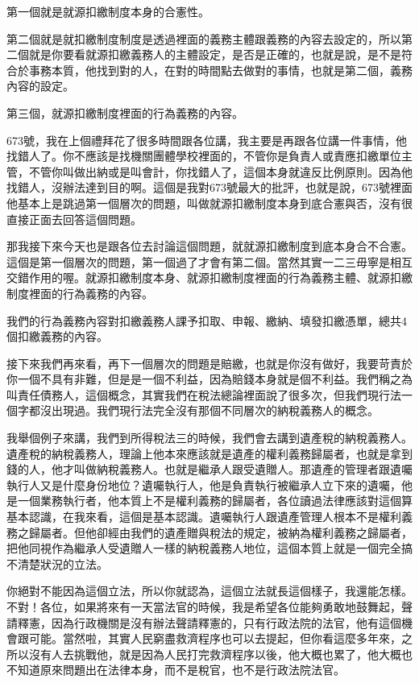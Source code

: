 \documentclass[]{ctexbook}
\begin{document}
第一個就是就源扣繳制度本身的合憲性。

第二個就是就扣繳制度制度是透過裡面的義務主體跟義務的內容去設定的，所以第二個就是你要看就源扣繳義務人的主體設定，是否是正確的，也就是說，是不是符合於事務本質，他找到對的人，在對的時間點去做對的事情，也就是第二個，義務內容的設定。

第三個，就源扣繳制度裡面的行為義務的內容。

673號，我在上個禮拜花了很多時間跟各位講，我主要是再跟各位講一件事情，他找錯人了。你不應該是找機關團體學校裡面的，不管你是負責人或責應扣繳單位主管，不管你叫做出納或是叫會計，你找錯人了，這個本身就違反比例原則。因為他找錯人，沒辦法達到目的啊。這個是我對673號最大的批評，也就是說，673號裡面他基本上是跳過第一個層次的問題，叫做就源扣繳制度本身到底合憲與否，沒有很直接正面去回答這個問題。

那我接下來今天也是跟各位去討論這個問題，就就源扣繳制度到底本身合不合憲。這個是第一個層次的問題，第一個過了才會有第二個。當然其實一二三毋寧是相互交錯作用的喔。就源扣繳制度本身、就源扣繳制度裡面的行為義務主體、就源扣繳制度裡面的行為義務的內容。

我們的行為義務內容對扣繳義務人課予扣取、申報、繳納、填發扣繳憑單，總共4個扣繳義務的內容。

接下來我們再來看，再下一個層次的問題是賠繳，也就是你沒有做好，我要苛責於你一個不具有非難，但是是一個不利益，因為賠錢本身就是個不利益。我們稱之為叫責任債務人，這個概念，其實我們在稅法總論裡面說了很多次，但我們現行法一個字都沒出現過。我們現行法完全沒有那個不同層次的納稅義務人的概念。

我舉個例子來講，我們到所得稅法三的時候，我們會去講到遺產稅的納稅義務人。遺產稅的納稅義務人，理論上他本來應該就是遺產的權利義務歸屬者，也就是拿到錢的人，他才叫做納稅義務人。也就是繼承人跟受遺贈人。那遺產的管理者跟遺囑執行人又是什麼身份地位？遺囑執行人，他是負責執行被繼承人立下來的遺囑，他是一個業務執行者，他本質上不是權利義務的歸屬者，各位讀過法律應該對這個算基本認識，在我來看，這個是基本認識。遺囑執行人跟遺產管理人根本不是權利義務之歸屬者。但他卻經由我們的遺產贈與稅法的規定，被納為權利義務之歸屬者，把他同視作為繼承人受遺贈人一樣的納稅義務人地位，這個本質上就是一個完全搞不清楚狀況的立法。

你絕對不能因為這個立法，所以你就認為，這個立法就長這個樣子，我還能怎樣。不對！各位，如果將來有一天當法官的時候，我是希望各位能夠勇敢地鼓舞起，聲請釋憲，因為行政機關是沒有辦法聲請釋憲的，只有行政法院的法官，他有這個機會跟可能。當然啦，其實人民窮盡救濟程序也可以去提起，但你看這麼多年來，之所以沒有人去挑戰他，就是因為人民打完救濟程序以後，他大概也累了，他大概也不知道原來問題出在法律本身，而不是稅官，也不是行政法院法官。
\end{document}
